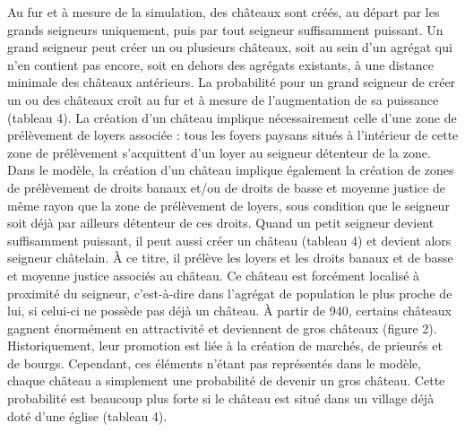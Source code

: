Au fur et à mesure de la simulation, des châteaux sont créés, au départ par les grands seigneurs uniquement, puis par tout seigneur suffisamment puissant.
Un grand seigneur peut créer un ou plusieurs châteaux, soit au sein d'un agrégat qui n'en contient pas encore, soit en dehors des agrégats existants, à une distance minimale des châteaux antérieurs.
La probabilité pour un grand seigneur de créer un ou des châteaux croît au fur et à mesure de l'augmentation de sa puissance (tableau 4).
La création d'un château implique nécessairement celle d'une zone de prélèvement de loyers associée :
tous les foyers paysans situés à l'intérieur de cette zone de prélèvement s'acquittent d'un loyer au seigneur détenteur de la zone.
Dans le modèle, la création d'un château implique également la création de zones de prélèvement de droits banaux et/ou de droits de basse et moyenne justice de même rayon que la zone de prélèvement de loyers, sous condition que le seigneur soit déjà par ailleurs détenteur de ces droits.
Quand un petit seigneur devient suffisamment puissant, il peut aussi créer un château (tableau 4) et devient alors seigneur châtelain.
À ce titre, il prélève les loyers et les droits banaux et de basse et moyenne justice associés au château.
Ce château est forcément localisé à proximité du seigneur, c'est-à-dire dans l'agrégat de population le plus proche de lui, si celui-ci ne possède pas déjà un château.
À partir de 940, certains châteaux gagnent énormément en attractivité et deviennent de gros châteaux (figure 2).
Historiquement, leur promotion est liée à la création de marchés, de prieurés et de bourgs.
Cependant, ces éléments n'étant pas représentés dans le modèle, chaque château a simplement une probabilité de devenir un gros château.
Cette probabilité est beaucoup plus forte si le château est situé dans un village déjà doté d'une église (tableau 4).


